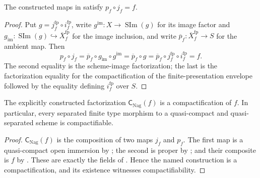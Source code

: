 \begin{lemma}
  \label{lemma:nagata-final-factorization}
    
  The constructed maps in
   satisfy $p_f\circ j_f=f$.
\end{lemma}

\begin{proof}
  Put $g=j_f^{\mathrm{fp}}\circ i_f^{\mathrm{fp}}$, write
  $g^{\mathrm{im}}\colon X\to\operatorname{SIm}(g)$ for its image factor and
  $g_{\mathrm{im}}\colon\operatorname{SIm}(g)\hookrightarrow
  \overline X_f^{\mathrm{fp}}$ for the image inclusion, and write
  $\overline p_f\colon\overline X_f^{\mathrm{fp}}\to S$ for the ambient map.
  Then
  \[
    p_f\circ j_f
      =\overline p_f\circ g_{\mathrm{im}}\circ g^{\mathrm{im}}
      =\overline p_f\circ g
      =\overline p_f\circ j_f^{\mathrm{fp}}\circ i_f^{\mathrm{fp}}
      =f.
  \]
  The second equality is the scheme-image factorization; the last is the
  factorization equality for the compactification of the finite-presentation
  envelope followed by the equality defining $i_f^{\mathrm{fp}}$ over $S$.
\end{proof}

\begin{theorem}
  \label{thm:nagata-compactification}

  The explicitly constructed factorization
  $\mathsf C_{\mathrm{Nag}}(f)$ is a compactification of $f$.  In particular,
  every separated finite type morphism to a quasi-compact and
  quasi-separated scheme is compactifiable.
\end{theorem}

\begin{proof}
  $\mathsf C_{\mathrm{Nag}}(f)$ is the composition of two maps $j_f$ and $p_f$. The first map is a quasi-compact open immersion by
  ; the second is proper by
  ; and their composite is $f$ by
  .  These are exactly the fields of
  .  Hence the named construction is a
  compactification, and its existence witnesses compactifiability.
\end{proof}
